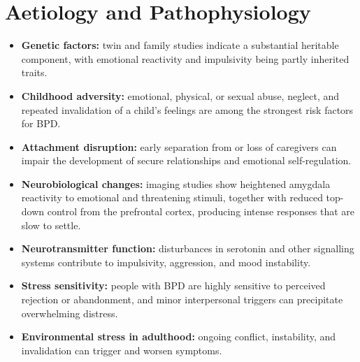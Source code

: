 \section*{Aetiology and Pathophysiology}
\begin{itemize}
    \item \textbf{Genetic factors:} twin and family studies indicate a substantial heritable component, with emotional reactivity and impulsivity being partly inherited traits.
    \item \textbf{Childhood adversity:} emotional, physical, or sexual abuse, neglect, and repeated invalidation of a child's feelings are among the strongest risk factors for BPD.
    \item \textbf{Attachment disruption:} early separation from or loss of caregivers can impair the development of secure relationships and emotional self-regulation.
    \item \textbf{Neurobiological changes:} imaging studies show heightened amygdala reactivity to emotional and threatening stimuli, together with reduced top-down control from the prefrontal cortex, producing intense responses that are slow to settle.
    \item \textbf{Neurotransmitter function:} disturbances in serotonin and other signalling systems contribute to impulsivity, aggression, and mood instability.
    \item \textbf{Stress sensitivity:} people with BPD are highly sensitive to perceived rejection or abandonment, and minor interpersonal triggers can precipitate overwhelming distress.
    \item \textbf{Environmental stress in adulthood:} ongoing conflict, instability, and invalidation can trigger and worsen symptoms.
\end{itemize}

